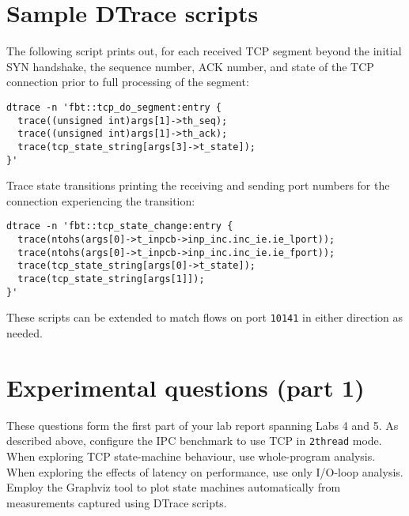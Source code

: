 \documentclass[a4paper,10pt]{article}
\begin{document}
\section*{Sample DTrace scripts}

The following script prints out, for each received TCP segment beyond the
initial SYN handshake, the sequence number, ACK number, and state of the TCP
connection prior to full processing of the segment:

\begin{verbatim}
dtrace -n 'fbt::tcp_do_segment:entry {
  trace((unsigned int)args[1]->th_seq);
  trace((unsigned int)args[1]->th_ack);
  trace(tcp_state_string[args[3]->t_state]);
}'
\end{verbatim}

\noindent
Trace state transitions printing the receiving and sending port numbers for
the connection experiencing the transition:

\begin{verbatim}
dtrace -n 'fbt::tcp_state_change:entry {
  trace(ntohs(args[0]->t_inpcb->inp_inc.inc_ie.ie_lport));
  trace(ntohs(args[0]->t_inpcb->inp_inc.inc_ie.ie_fport));
  trace(tcp_state_string[args[0]->t_state]);
  trace(tcp_state_string[args[1]]);
}'
\end{verbatim}

\noindent
These scripts can be extended to match flows on port \texttt{10141} in either
direction as needed.

\section*{Experimental questions (part 1)}

These questions form the first part of your lab report spanning Labs 4 and 5.
As described above, configure the IPC benchmark to use TCP in \texttt{2thread}
mode.
When exploring TCP state-machine behaviour, use whole-program analysis.
When exploring the effects of latency on performance, use only I/O-loop
analysis.
Employ the Graphviz tool to plot state machines automatically from
measurements captured using DTrace scripts.
\end{document}
